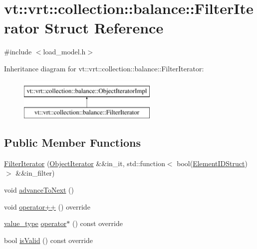\hypertarget{structvt_1_1vrt_1_1collection_1_1balance_1_1_filter_iterator}{}\section{vt\+:\+:vrt\+:\+:collection\+:\+:balance\+:\+:Filter\+Iterator Struct Reference}
\label{structvt_1_1vrt_1_1collection_1_1balance_1_1_filter_iterator}


{\ttfamily \#include $<$load\+\_\+model.\+h$>$}

Inheritance diagram for vt\+:\+:vrt\+:\+:collection\+:\+:balance\+:\+:Filter\+Iterator\+:\begin{figure}[H]
\begin{center}
\leavevmode
\includegraphics[height=2.000000cm]{structvt_1_1vrt_1_1collection_1_1balance_1_1_filter_iterator}
\end{center}
\end{figure}
\subsection*{Public Member Functions}
\begin{DoxyCompactItemize}
\item 
\hyperlink{structvt_1_1vrt_1_1collection_1_1balance_1_1_filter_iterator_a42adc2e7e360cfe536246aec10814296}{Filter\+Iterator} (\hyperlink{structvt_1_1vrt_1_1collection_1_1balance_1_1_object_iterator}{Object\+Iterator} \&\&in\+\_\+it, std\+::function$<$ bool(\hyperlink{namespacevt_1_1vrt_1_1collection_1_1balance_a9f5b53fafb270212279a4757d2c4cd28}{Element\+I\+D\+Struct})$>$ \&\&in\+\_\+filter)
\item 
void \hyperlink{structvt_1_1vrt_1_1collection_1_1balance_1_1_filter_iterator_a31bcf02ff4636713a425602de22b8f93}{advance\+To\+Next} ()
\item 
void \hyperlink{structvt_1_1vrt_1_1collection_1_1balance_1_1_filter_iterator_a354817d66e2736b1de818b4548419476}{operator++} () override
\item 
\hyperlink{structvt_1_1vrt_1_1collection_1_1balance_1_1_object_iterator_impl_a8a38ab2c722e341d729f61cb59112376}{value\+\_\+type} \hyperlink{structvt_1_1vrt_1_1collection_1_1balance_1_1_filter_iterator_a4812753d95ef26ea45dc053adc07cd3f}{operator$\ast$} () const override
\item 
bool \hyperlink{structvt_1_1vrt_1_1collection_1_1balance_1_1_filter_iterator_a3c92442ef2c78f8bd7bc2f03d06c11a1}{is\+Valid} () const override
\end{DoxyCompactItemize}
